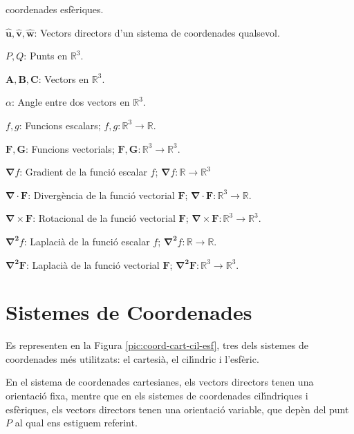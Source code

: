 \documentclass[catalan,a4paper,twoside,11pt]{article}
\begin{document}
\begin{list}{}
   coordenades esf\`{e}riques.
   \item[$\boldsymbol{\hat{u}},\boldsymbol{\hat{v}},\boldsymbol{\hat{w}}$:]
   Vectors directors d'un sistema de  coordenades
   qualsevol.
   \item[$P, Q$:] Punts en $\mathbb{R}^3$.
   \item[$\boldsymbol{A,B,C}$:] Vectors en $\mathbb{R}^3$.
   \item[$\alpha$:] Angle entre dos vectors en $\mathbb{R}^3$.
   \item[$f,g$:] Funcions escalars; $f,g \colon \mathbb{R}^3\rightarrow\mathbb{R}$.
   \item[$\boldsymbol{F,G}$:] Funcions vectorials; $\boldsymbol{F,G}\colon\mathbb{R}^3\rightarrow\mathbb{R}^3$.
   \item[$\boldsymbol{\nabla}f$:] Gradient de la funci\'{o} escalar $f$;
   $\boldsymbol{\nabla}f\colon\mathbb{R}\rightarrow\mathbb{R}^3$
   \item[$\boldsymbol{\nabla\cdot F}$:] Diverg\`{e}ncia de la funci\'{o} vectorial $\boldsymbol{F}$;
   $\boldsymbol{\nabla\cdot F}\colon \mathbb{R}^3\rightarrow\mathbb{R}$.
   \item[$\boldsymbol{\nabla\times F}$:] Rotacional de la funci\'{o} vectorial $\boldsymbol{F}$;
   $\boldsymbol{\nabla\times F}\colon   \mathbb{R}^3\rightarrow\mathbb{R}^3$.
   \item[$\boldsymbol{\nabla^2}f$:] Laplaci\`{a} de la funci\'{o} escalar $f$;
   $\boldsymbol{\nabla^2}f\colon \mathbb{R}\rightarrow\mathbb{R}$.
   \item[$\boldsymbol{\nabla^2F}$:] Laplaci\`{a} de la funci\'{o} vectorial $\boldsymbol{F}$; $\boldsymbol{\nabla^2F}\colon \mathbb{R}^3\rightarrow\mathbb{R}^3$.
\end{list}

\newcommand{\va}{\ensuremath{\,\boldsymbol{\hat{x}}}}
\newcommand{\vb}{\ensuremath{\,\boldsymbol{\hat{y}}}}
\newcommand{\vc}{\ensuremath{\,\boldsymbol{\hat{z}}}}
\section{Sistemes de Coordenades}

Es representen en la Figura \vref{pic:coord-cart-cil-esf}, tres dels
sistemes de coordenades m\'{e}s utilitzats: el cartesi\`{a}, el
cil\'{\i}ndric i l'esf\`{e}ric.

En el sistema de coordenades cartesianes, els vectors directors
tenen una orientaci\'{o} fixa, mentre que en els sistemes de
coordenades cil\'{\i}ndriques i esf\`{e}riques, els vectors
directors tenen una orientaci\'{o} variable, que dep\`{e}n del punt
$P$ al qual ens estiguem referint.
\end{document}
